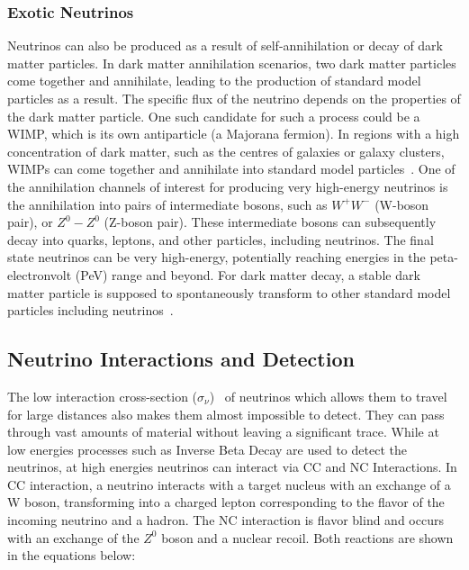 \subsubsection*{Exotic Neutrinos}
\label{subsubsec:ExoticNu}

Neutrinos can also be produced as a result of self-annihilation or decay of dark matter particles. In dark matter annihilation scenarios, two dark matter particles come together and annihilate, leading to the production of standard model particles as a result. The specific flux of the neutrino depends on the properties of the dark matter particle. One such candidate for such a process could be a \gls{WIMP}, which is its own antiparticle (a Majorana fermion). In regions with a high concentration of dark matter, such as the centres of galaxies or galaxy clusters, \glspl{WIMP} can come together and annihilate into standard model particles~\cite{10.1111/j.1365-2966.2008.13366.x}. One of the annihilation channels of interest for producing very high-energy neutrinos is the annihilation into pairs of intermediate bosons, such as $W^+W^-$ (W-boson pair), or $Z^0 - Z^0$ (Z-boson pair). These intermediate bosons can subsequently decay into quarks, leptons, and other particles, including neutrinos. The final state neutrinos can be very high-energy, potentially reaching energies in the peta-electronvolt (PeV) range and beyond. For dark matter decay, a stable dark matter particle is supposed to spontaneously transform to other standard model particles including neutrinos~\cite{PhysRevD.108.123021}. 


\subsection{Neutrino Interactions and Detection}
\label{subsec:Nuintdet}

The low interaction cross-section ($\sigma_{\nu}$)~\cite{Formaggio_2012} of neutrinos which allows them to travel for large distances also makes them almost impossible to detect. They can pass through vast amounts of material without leaving a significant trace. While at low energies processes such as Inverse Beta Decay are used to detect the neutrinos, at high energies neutrinos can interact via \gls{CC} and \gls{NC} Interactions. In \gls*{CC} interaction, a neutrino interacts with a target nucleus with an exchange of a W boson, transforming into a charged lepton corresponding to the flavor of the incoming neutrino and a hadron. The NC interaction is flavor blind and occurs with an exchange of the $Z^0$ boson and a nuclear recoil. Both reactions are shown in the equations below:

